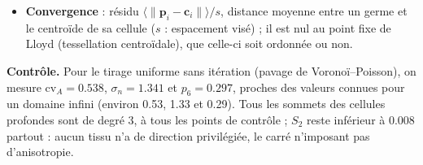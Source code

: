 \documentclass[10pt,a4paper]{article}
\newcommand{\vect}[1]{\boldsymbol{#1}}
\begin{document}
\begin{itemize}
    $f_{57}$, fraction des parois séparant un pentagone et un heptagone, et l'\emph{enrichissement}
    $E_{57}=f_{57}/(2q_5q_7)$, rapport à la valeur attendue si les défauts étaient placés indépendamment
    ($q_n=np_n/6$ : fraction des extrémités de paroi sur une cellule à $n$ côtés ; $E_{57}=1$ sans corrélation,
    $E_{57}>1$ : pentagones et heptagones accolés) ;
    $\tau_{T1}$, nombre de transitions T1 (une paire de voisins perdue, une gagnée) par cellule et par itération
    entre deux points de contrôle, compté sur les voisinages entre cellules profondes ; il mesure l'activité
    topologique. Enfin, la fraction de sommets de degré 3 sert de contrôle (pavage de Voronoï générique : 1) ;
  \item \textbf{Convergence} : résidu $\langle\|\vect p_i-\vect c_i\|\rangle/s$, distance moyenne entre un germe et
    le centroïde de sa cellule ($s$ : espacement visé) ; il est nul au point fixe de Lloyd (tessellation
    centroïdale), que celle-ci soit ordonnée ou non.
\end{itemize}

\textbf{Contrôle.} Pour le tirage uniforme sans itération (pavage de Voronoï--Poisson), on mesure
$\mathrm{cv}_A=0.538$, $\sigma_n=1.341$ et $p_6=0.297$, proches des valeurs connues pour un domaine infini
(environ 0.53, 1.33 et 0.29). Tous les sommets des cellules profondes sont de degré 3, à tous les points de
contrôle ; $S_2$ reste inférieur à $0.008$ partout : aucun tissu n'a de direction privilégiée, le carré
n'imposant pas d'anisotropie.
\end{document}

